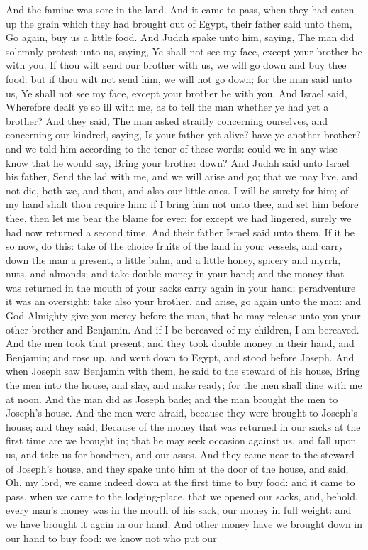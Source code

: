 And the famine was sore in the land. And it came to pass, when they had eaten up the grain which they had brought out of Egypt, their father said unto them, Go again, buy us a little food. And Judah spake unto him, saying, The man did solemnly protest unto us, saying, Ye shall not see my face, except your brother be with you. If thou wilt send our brother with us, we will go down and buy thee food: but if thou wilt not send him, we will not go down; for the man said unto us, Ye shall not see my face, except your brother be with you. And Israel said, Wherefore dealt ye so ill with me, as to tell the man whether ye had yet a brother? And they said, The man asked straitly concerning ourselves, and concerning our kindred, saying, Is your father yet alive? have ye another brother? and we told him according to the tenor of these words: could we in any wise know that he would say, Bring your brother down? And Judah said unto Israel his father, Send the lad with me, and we will arise and go; that we may live, and not die, both we, and thou, and also our little ones. I will be surety for him; of my hand shalt thou require him: if I bring him not unto thee, and set him before thee, then let me bear the blame for ever: for except we had lingered, surely we had now returned a second time. And their father Israel said unto them, If it be so now, do this: take of the choice fruits of the land in your vessels, and carry down the man a present, a little balm, and a little honey, spicery and myrrh, nuts, and almonds; and take double money in your hand; and the money that was returned in the mouth of your sacks carry again in your hand; peradventure it was an oversight: take also your brother, and arise, go again unto the man: and God Almighty give you mercy before the man, that he may release unto you your other brother and Benjamin. And if I be bereaved of my children, I am bereaved. And the men took that present, and they took double money in their hand, and Benjamin; and rose up, and went down to Egypt, and stood before Joseph.  And when Joseph saw Benjamin with them, he said to the steward of his house, Bring the men into the house, and slay, and make ready; for the men shall dine with me at noon. And the man did as Joseph bade; and the man brought the men to Joseph’s house. And the men were afraid, because they were brought to Joseph’s house; and they said, Because of the money that was returned in our sacks at the first time are we brought in; that he may seek occasion against us, and fall upon us, and take us for bondmen, and our asses. And they came near to the steward of Joseph’s house, and they spake unto him at the door of the house, and said, Oh, my lord, we came indeed down at the first time to buy food: and it came to pass, when we came to the lodging-place, that we opened our sacks, and, behold, every man’s money was in the mouth of his sack, our money in full weight: and we have brought it again in our hand. And other money have we brought down in our hand to buy food: we know not who put our 
